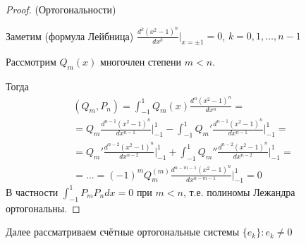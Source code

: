 \documentclass{article}
\begin{document}
\begin{proof}
  (Ортогональности)

  Заметим (формула Лейбница) $\frac{d^{k}(x^{2}-1)^{n}}{dx^{k}} \big|_{x=\pm 1}=0 $,
  $k=0,1,\dots ,n-1$

  Рассмотрим $Q_m(x)$ многочлен степени $m<n$.

  Тогда
  \begin{gather*}
    (Q_m,P_n)=\int_{-1}^{1}Q_m(x)\frac{d^{n}(x^{2}-1)^{n}}{dx^{n}}= \\ 
    =Q_m \frac{d^{n-1}(x^{2}-1)^{n}}{dx^{n-1}}\big|_{-1}^{1}- \int_{-1}^{1}Q_m'\frac{d^{n-1}(x^{2}-1)^{n}}{dx^{n-1}}\big|_{-1}^{1} = \\ 
    = Q_m'\frac{d^{n-2}(x^{2}-1)^{n}}{dx^{n-2}}\big|_{-1}^{1} + \int_{-1}^{1}Q_m''\frac{d^{n-2}(x^{2}-1)^{n}}{dx^{n-2}}\big|_{-1}^{1} = \\ 
    = \dots = (-1)^{m}Q_m^{(m)}\frac{d^{n-m-1}(x^{2}-1)^{n}}{dx^{n-m-1}}\big|_{-1}^{1}=0
  \end{gather*}
  В частности $\int_{-1}^{1}P_mP_ndx=0$ при $m<n$, т.е. полиномы Лежандра ортогональны.
\end{proof}

Далее рассматриваем счётные ортогональные системы $\{e_k\}: e_k\neq0$
\end{document}
